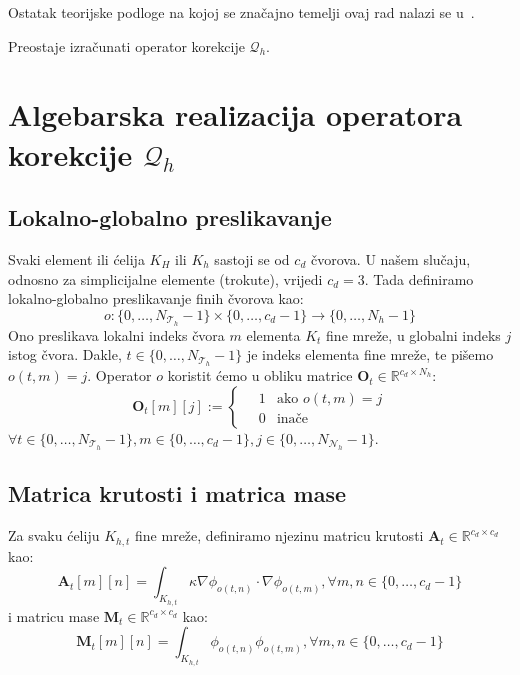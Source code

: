 \documentclass[zavrsnirad]{fer}
\begin{document}
Ostatak teorijske podloge na kojoj se značajno temelji ovaj rad nalazi se u~\cite{msfem_additive}.

Preostaje izračunati operator korekcije $\mathcal{Q}_h$.


\section{Algebarska realizacija operatora korekcije $\mathcal{Q}_h$}


\subsection{Lokalno-globalno preslikavanje}

Svaki element ili ćelija $K_H$ ili $K_h$ sastoji se od $c_d$ čvorova. U našem slučaju, odnosno za simplicijalne elemente
(trokute), vrijedi $c_d = 3$. Tada definiramo lokalno-globalno preslikavanje finih čvorova kao:
\begin{equation}
  \label{jed:Lambda}
  o : \{0, \ldots, N_{\mathcal{T}_h} - 1\} \times \{0, \ldots, c_d - 1\} \to \{0, \ldots, N_h - 1\}
\end{equation}
Ono preslikava lokalni indeks čvora $m$ elementa $K_t$ fine mreže, u globalni indeks $j$ istog čvora. Dakle,
$t \in \{0, \ldots, N_{\mathcal{T}_h} - 1\}$ je indeks elementa fine mreže, te pišemo $o(t, m) = j$.
Operator $o$ koristit ćemo u obliku matrice $\mathbf{O}_t \in \mathbb{R}^{c_d \times N_h}$:
\begin{equation}
  \label{jed:Lambda_matrix}
  \mathbf{O}_t[m][j] := \begin{cases}
    \quad 1 & \text{ako } o(t, m) = j \\
    \quad 0 & \text{inače}
  \end{cases}
\end{equation}
$\forall t \in \{0, \ldots, N_{\mathcal{T}_h} - 1\}, m \in \{0, \ldots, c_d - 1\}, j \in \{0, \ldots, N_{\mathcal{N}_h} - 1\}$.



\subsection{Matrica krutosti i matrica mase}

Za svaku ćeliju $K_{h,t}$ fine mreže, definiramo njezinu matricu krutosti $\mathbf{A}_t \in \mathbb{R}^{c_d \times c_d}$ kao:
\begin{equation}
  \label{jed:element_stiffness_matrix}
  \mathbf{A}_t[m][n] = \int_{K_{h,t}} \kappa \nabla \phi_{o(t, n)} \cdot \nabla \phi_{o(t, m)}, \forall m, n \in \{0, \ldots, c_d - 1\}
\end{equation}
i matricu mase $\mathbf{M}_t \in \mathbb{R}^{c_d \times c_d}$ kao:
\begin{equation}
  \label{jed:element_mass_matrix}
  \mathbf{M}_t[m][n] = \int_{K_{h,t}} \phi_{o(t, n)} \phi_{o(t, m)}, \forall m, n \in \{0, \ldots, c_d - 1\}
\end{equation}
\end{document}
